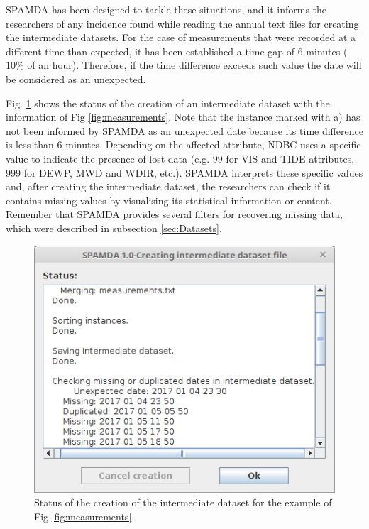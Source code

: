 \documentclass[review]{elsarticle}
\begin{document}
		SPAMDA has been designed to tackle these situations, and it informs the researchers of any incidence found while reading the annual text files for creating the intermediate datasets. For the case of measurements that were recorded at a different time than expected, it has been established a time gap of 6 minutes ($10\%$ of an hour). Therefore, if the time difference exceeds such value the date will be considered as an unexpected.
		
		Fig. \ref{fig:creatingDataset} shows the status of the creation of an intermediate dataset with the information of Fig \ref{fig:measurements}. Note that the instance marked with a) has not been informed by SPAMDA as an unexpected date because its time difference is less than $6$ minutes. Depending on the affected attribute, NDBC uses a specific value \cite{NOAA_3} to indicate the presence of lost data (e.g. $99$ for VIS and TIDE attributes, $999$ for DEWP, MWD and WDIR, etc.). SPAMDA interprets these specific values and, after creating the intermediate dataset, the researchers can check if it contains missing values by visualising its statistical information or content. Remember that SPAMDA provides several filters for recovering missing data, which were described in subsection \ref{sec:Datasets}.
		
		\begin{figure}[ht!]
			\centering
			\includegraphics[scale=0.40]{figures/FigureCreatingDataset.png}
			\caption{Status of the creation of the intermediate dataset for the example of Fig \ref{fig:measurements}.}
			\label{fig:creatingDataset}
		\end{figure}
		
\end{document}
